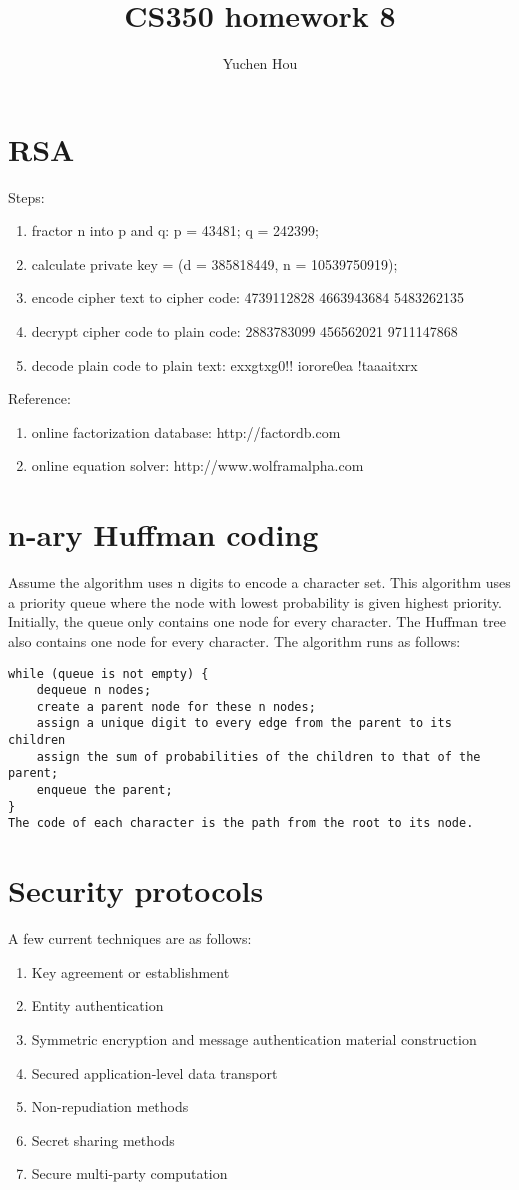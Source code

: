 \documentclass{article}
\begin{document}
\lstset{language=Java, tabsize=4}
\title{CS350 homework 8}
\author{Yuchen Hou}
\maketitle
\section{RSA}
Steps:
\begin{enumerate}
  \item fractor n into p and q: p = 43481; q = 242399;
  \item calculate private key = (d = 385818449, n = 10539750919);
  \item encode cipher text to cipher code: 4739112828 4663943684 5483262135
  \item decrypt cipher code to plain code: 2883783099 456562021 9711147868
  \item decode plain code to plain text: exxgtxg0!! iorore0ea !taaaitxrx
\end{enumerate}
Reference:
\begin{enumerate}
  \item online factorization database: http://factordb.com
  \item online equation solver: http://www.wolframalpha.com
\end{enumerate}
\section{n-ary Huffman coding}
Assume the algorithm uses n digits to encode a character set. This algorithm
uses a priority queue where the node with lowest probability is given highest
priority. Initially, the queue only contains one node for every character. The
Huffman tree also contains one node for every character. The algorithm runs as
follows:
\begin{lstlisting}
while (queue is not empty) {
	dequeue n nodes;
	create a parent node for these n nodes;
	assign a unique digit to every edge from the parent to its children
	assign the sum of probabilities of the children to that of the parent;
	enqueue the parent;
}
The code of each character is the path from the root to its node.
\end{lstlisting}
\section{Security protocols}
A few current techniques are as follows:
\begin{enumerate}
  \item Key agreement or establishment
  \item Entity authentication
  \item Symmetric encryption and message authentication material construction
  \item Secured application-level data transport
  \item Non-repudiation methods
  \item Secret sharing methods
  \item Secure multi-party computation
\end{enumerate}
\end{document}
